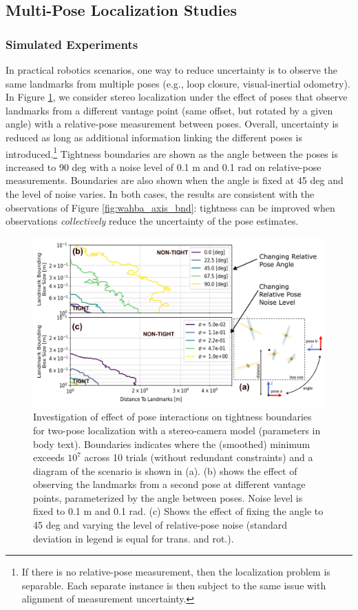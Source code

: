 \subsection{Multi-Pose Localization Studies}\label{App:MultiPoseLoc}

\subsubsection{Simulated Experiments}

In practical robotics scenarios, one way to reduce uncertainty is to observe the same landmarks from multiple poses (e.g., loop closure, visual-inertial odometry). In Figure \ref{fig:stereo_angle}, we consider stereo localization under the effect of poses that observe landmarks from a different vantage point (same offset, but rotated by a given angle) with a relative-pose measurement between poses. Overall, uncertainty is reduced as long as additional information linking the different poses is introduced.\footnote{If there is no relative-pose measurement, then the localization problem is separable. Each separate instance is then subject to the same issue with alignment of measurement uncertainty.} Tightness boundaries are shown as the angle between the poses is increased to 90 deg with a noise level of 0.1 m and 0.1 rad on relative-pose measurements. Boundaries are also shown when the angle is fixed at 45 deg and the level of noise varies. In both cases, the results are consistent with the observations of Figure \ref{fig:wahba_axis_bnd}: tightness can be improved when observations \emph{collectively} reduce the uncertainty of the pose estimates.

\begin{figure}[!b]
	\centering
	\includegraphics[width=\columnwidth]{figs/stereo_angle_study}
	\caption{Investigation of effect of pose interactions on tightness boundaries for two-pose localization with a stereo-camera model (parameters in body text). Boundaries indicates where the (smoothed) minimum  exceeds $ 10^{7}$ across 10 trials (without redundant constraints) and a diagram of the scenario is shown in (a). (b) shows the effect of observing the landmarks from a second pose at different vantage points, parameterized by the angle between poses. Noise level is fixed to 0.1 m and 0.1 rad. (c) Shows the effect of fixing the angle to 45 deg and varying the level of relative-pose noise (standard deviation in legend is equal for trans. and rot.).}
	\label{fig:stereo_angle}
\end{figure}

